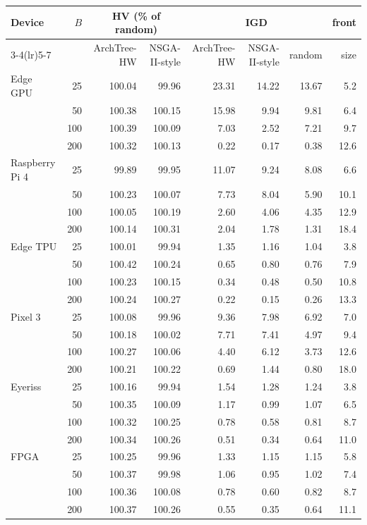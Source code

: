 \begin{tabular}{@{}lrrrrrrr@{}}
\toprule
\multirow{2}{*}{Device} & \multirow{2}{*}{$B$} & \multicolumn{2}{c}{HV (\% of random)} & \multicolumn{3}{c}{IGD} & front\\
\cmidrule(lr){3-4}\cmidrule(lr){5-7}
 & & ArchTree-HW & NSGA-II-style & ArchTree-HW & NSGA-II-style & random & size\\
\midrule
Edge GPU & 25 & 100.04 & 99.96 & 23.31 & 14.22 & 13.67 & 5.2\\
 & 50 & 100.38 & 100.15 & 15.98 & 9.94 & 9.81 & 6.4\\
 & 100 & 100.39 & 100.09 & 7.03 & 2.52 & 7.21 & 9.7\\
 & 200 & 100.32 & 100.13 & 0.22 & 0.17 & 0.38 & 12.6\\
\midrule
Raspberry Pi 4 & 25 & 99.89 & 99.95 & 11.07 & 9.24 & 8.08 & 6.6\\
 & 50 & 100.23 & 100.07 & 7.73 & 8.04 & 5.90 & 10.1\\
 & 100 & 100.05 & 100.19 & 2.60 & 4.06 & 4.35 & 12.9\\
 & 200 & 100.14 & 100.31 & 2.04 & 1.78 & 1.31 & 18.4\\
\midrule
Edge TPU & 25 & 100.01 & 99.94 & 1.35 & 1.16 & 1.04 & 3.8\\
 & 50 & 100.42 & 100.24 & 0.65 & 0.80 & 0.76 & 7.9\\
 & 100 & 100.23 & 100.15 & 0.34 & 0.48 & 0.50 & 10.8\\
 & 200 & 100.24 & 100.27 & 0.22 & 0.15 & 0.26 & 13.3\\
\midrule
Pixel 3 & 25 & 100.08 & 99.96 & 9.36 & 7.98 & 6.92 & 7.0\\
 & 50 & 100.18 & 100.02 & 7.71 & 7.41 & 4.97 & 9.4\\
 & 100 & 100.27 & 100.06 & 4.40 & 6.12 & 3.73 & 12.6\\
 & 200 & 100.21 & 100.22 & 0.69 & 1.44 & 0.80 & 18.0\\
\midrule
Eyeriss & 25 & 100.16 & 99.94 & 1.54 & 1.28 & 1.24 & 3.8\\
 & 50 & 100.35 & 100.09 & 1.17 & 0.99 & 1.07 & 6.5\\
 & 100 & 100.32 & 100.25 & 0.78 & 0.58 & 0.81 & 8.7\\
 & 200 & 100.34 & 100.26 & 0.51 & 0.34 & 0.64 & 11.0\\
\midrule
FPGA & 25 & 100.25 & 99.96 & 1.33 & 1.15 & 1.15 & 5.8\\
 & 50 & 100.37 & 99.98 & 1.06 & 0.95 & 1.02 & 7.4\\
 & 100 & 100.36 & 100.08 & 0.78 & 0.60 & 0.82 & 8.7\\
 & 200 & 100.37 & 100.26 & 0.55 & 0.35 & 0.64 & 11.1\\
\bottomrule
\end{tabular}
